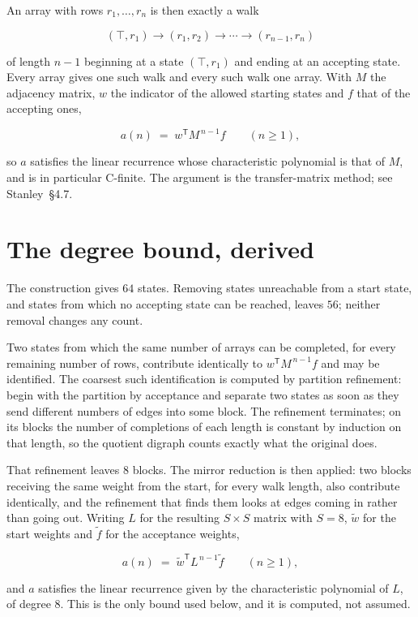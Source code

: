 \documentclass[11pt]{article}
\theoremstyle{definition}
\begin{document}
An array with rows $r_1,\dots,r_n$ is then exactly a walk

\[(\top,r_1) \to (r_1,r_2) \to \cdots \to (r_{n-1},r_n)\]

of length $n-1$ beginning at a state $(\top,r_1)$ and ending at an accepting state. Every array gives one such walk and every such walk one array. With $M$ the adjacency matrix, $w$ the indicator of the allowed starting states and $f$ that of the accepting ones,

\[a(n) \;=\; w^{\mathsf T} M^{\,n-1} f \qquad (n \ge 1),\]

so $a$ satisfies the linear recurrence whose characteristic polynomial is that of $M$, and is in particular C-finite. The argument is the transfer-matrix method; see Stanley~\S4.7.

\section{The degree bound, derived}

The construction gives $64$ states. Removing states unreachable from a start state, and states from which no accepting state can be reached, leaves $56$; neither removal changes any count.

Two states from which the same number of arrays can be completed, for every remaining number of rows, contribute identically to $w^{\mathsf T}M^{\,n-1}f$ and may be identified. The coarsest such identification is computed by partition refinement: begin with the partition by acceptance and separate two states as soon as they send different numbers of edges into some block. The refinement terminates; on its blocks the number of completions of each length is constant by induction on that length, so the quotient digraph counts exactly what the original does.

That refinement leaves $8$ blocks. The mirror reduction is then applied: two blocks receiving the same weight from the start, for every walk length, also contribute identically, and the refinement that finds them looks at edges coming in rather than going out. Writing $L$ for the resulting $S \times S$ matrix with $S = 8$, $\tilde w$ for the start weights and $\tilde f$ for the acceptance weights,

\[a(n) \;=\; \tilde w^{\mathsf T} L^{\,n-1} \tilde f \qquad (n \ge 1),\]

and $a$ satisfies the linear recurrence given by the characteristic polynomial of $L$, of degree $8$. This is the only bound used below, and it is computed, not assumed.
\end{document}
